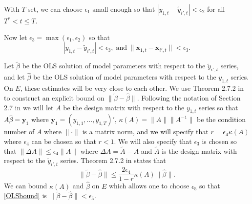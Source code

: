 \documentclass[11pt]{article}
\newcommand{\x}{\textbf{x}}
\theoremstyle{definition}
\begin{document}
With $T$ set, we can choose $\epsilon_1$ small enough so that 
$
  |y_{1,t} - \tilde{y}_{i',t}| < \epsilon_2
$
for all $T^* < t \leq T $. 

Now let $\epsilon_3 = \max(\epsilon_1,\epsilon_2)$ so that 
\begin{equation} \label{bounds}
	|y_{1,t} - \tilde{y}_{i',t}| < \epsilon_3, \; \text{and} \; \|\x_{1,t} - \x_{i',t}\| < \epsilon_3.
\end{equation}

Let $\tilde{\beta}$ be the OLS solution of model parameters with respect to the $\tilde{y}_{i',t}$ series, and let $\hat{\beta}$ be the OLS solution of model parameters with respect to the $y_{1,t}$ series. On $E$, these estimates will be very close to each other. We use Theorem 2.7.2 in \cite{golub1996matrix} to construct an explicit bound on $\|\tilde{\beta} - \hat{\beta}\|$. Following the notation of Section 2.7 in \cite{golub1996matrix} we will let $A$ be the design matrix with respect to the $y_{1,t}$ series so that $A\hat{\beta} = \mathbf{y}_1$ where $\mathbf{y}_1 = (y_{1,1}, \ldots, y_{1,T})'$, $\kappa(A) = \|A\|\|A^{-1}\|$ be the condition number of $A$ where $\|\cdot\|$ is a matrix norm, and we will specify that $r = \epsilon_4 \kappa(A)$ where $\epsilon_4$ can be chosen so that $r < 1$. We will also specify that $\epsilon_3$ is chosen so that $\|\Delta A\| \leq \epsilon_4\|A\|$ where $\Delta A = \widetilde{A} - A$ and $\widetilde{A}$ is the design matrix with respect to the $\tilde{y}_{i',t}$ series. Theorem 2.7.2 in \cite{golub1996matrix} states that 
\begin{equation}\label{OLSbound}
  \|\tilde{\beta} - \hat{\beta}\| \leq \frac{2\epsilon_4}{1-r}\kappa(A)\|\hat{\beta}\|.	
\end{equation}
We can bound $\kappa(A)$ and $\hat{\beta}$ on $E$ which allows one to choose $\epsilon_5$ so that \eqref{OLSbound} is $\|\tilde{\beta} - \hat{\beta}\| < \epsilon_5$. 
\end{document}
